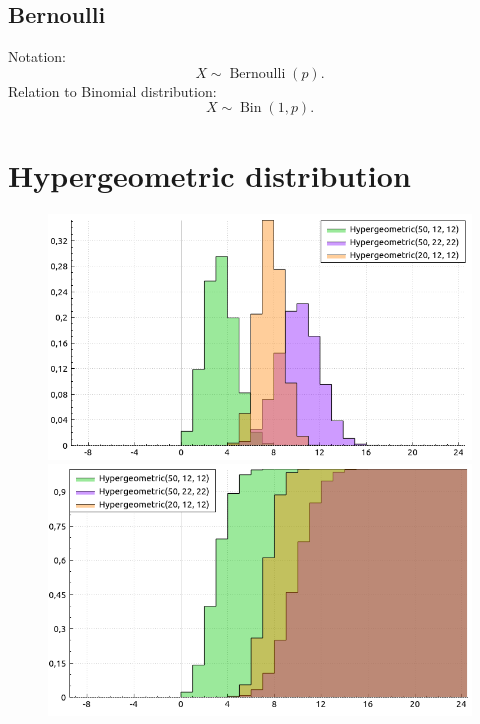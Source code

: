 \documentclass[a4paper,11pt]{article}
\theoremstyle{plain}
\theoremstyle{definition}
\begin{document}
	\subsection{Bernoulli}
	Notation:
	\[ X \sim \operatorname{Bernoulli}(p). \]
	Relation to Binomial distribution: \[X \sim \operatorname{Bin}(1, p). \]
	
	\pagebreak
	\section{Hypergeometric distribution}
		\begin{figure}[!htb]\centering
			\begin{minipage}{0.55\textwidth}
				\includegraphics[width=\linewidth, right]{hypergeometric_pmf}
				\captionsetup{labelformat=empty}
				\includegraphics[width=\linewidth, right]{hypergeometric_cdf}
				\captionsetup{labelformat=empty}
			\end{minipage}
			\begin{minipage}{0.4\textwidth}
				\begin{tabular}{| r | l |}

\end{tabular}
\end{minipage}
\end{figure}
\end{document}
